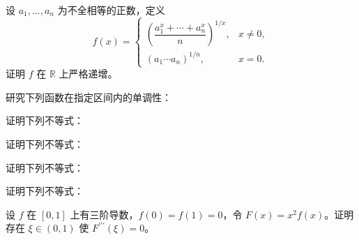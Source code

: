 \newpage
\noindent\begin{minipage}{\textwidth}
设 $a_1,\ldots,a_n$ 为不全相等的正数，定义\[f(x)=\begin{cases}\left(\dfrac{a_1^x+\cdots+a_n^x}{n}\right)^{1/x},&x\ne0,\\(a_1\cdots a_n)^{1/n},&x=0.\end{cases}\]证明 $f$ 在 $\mathbb R$ 上严格递增。
\end{minipage}\par\vfill
\noindent\begin{minipage}{\textwidth}
研究下列函数在指定区间内的单调性：
\end{minipage}\par\vfill
\noindent\begin{minipage}{\textwidth}
证明下列不等式：
\end{minipage}\par\vfill
\newpage
\noindent\begin{minipage}{\textwidth}
证明下列不等式：
\end{minipage}\par\vfill
\noindent\begin{minipage}{\textwidth}
证明下列不等式：
\end{minipage}\par\vfill
\noindent\begin{minipage}{\textwidth}
证明下列不等式：
\end{minipage}\par\vfill
\newpage
\noindent\begin{minipage}{\textwidth}
设 $f$ 在 $[0,1]$ 上有三阶导数，$f(0)=f(1)=0$，令 $F(x)=x^2f(x)$。证明存在 $\xi\in(0,1)$ 使 $F^{\prime\prime\prime}(\xi)=0$。
\end{minipage}\par\vfill
